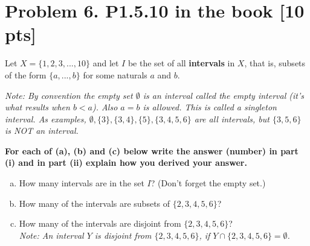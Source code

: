 \documentclass[12pt]{article}
\begin{document}
	\newpage
	\section*{\textbf{Problem 6. P1.5.10 in the book} [10 pts]}
	Let $X = \{1, 2, 3,. .., 10\}$ and let $I$ be the set of all \textbf{intervals}
	in $X$, that is, subsets of the form $\{a,. .., b\}$ for some naturals $a$ and
	$b$.

	\medskip
	{\em \small Note: By convention the empty set $\emptyset$ is an interval called the {\em empty interval} (it's what results when $b <a$). Also $a=b$ is allowed. This is called a singleton interval. As examples, $\emptyset, \{3\}, \{3,4\}, \{5\} , \{3,4,5,6\}$ are all intervals, but $\{3,5,6\}$ is NOT an interval.}

	\bigskip

	{\bf For each of (a), (b) and (c) below write the answer (number) in part (i) and in part (ii) explain how you derived your answer.}

	\begin{enumerate}[(a)]
		\item How many intervals are in the set $I$? (Don’t forget the empty set.)

		\item How many of the intervals are subsets of $\{2, 3, 4, 5, 6\}$?

		\item How many of the intervals are disjoint from $\{2, 3, 4, 5, 6\}$?\\
			{\em \small Note: An interval $Y$ is {\em disjoint} from $\{2, 3, 4, 5, 6\}$, if $Y \cap \{2, 3, 4, 5, 6\}= \emptyset$. }
	\end{enumerate}

	\bigskip
\end{document}

